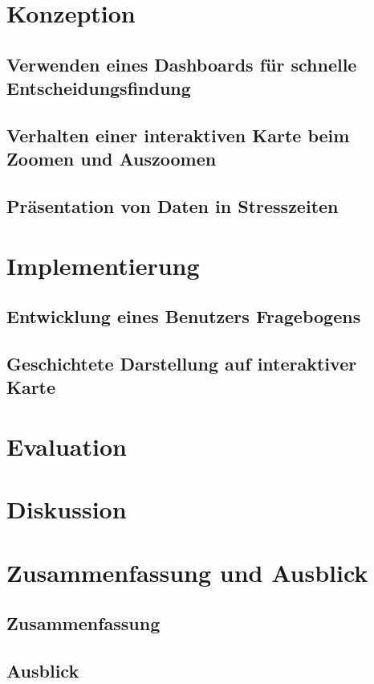 




\chapter{Konzeption}
\section{Verwenden eines Dashboards für schnelle Entscheidungsfindung}
\section{Verhalten einer interaktiven Karte beim Zoomen und Auszoomen}
\section{Präsentation von Daten in Stresszeiten}

\chapter{Implementierung}
\section{Entwicklung eines Benutzers Fragebogens}
\section{Geschichtete Darstellung auf interaktiver Karte}

\chapter{Evaluation}

\chapter{Diskussion}

\chapter{Zusammenfassung und Ausblick}
\section{Zusammenfassung}
\section{Ausblick}
